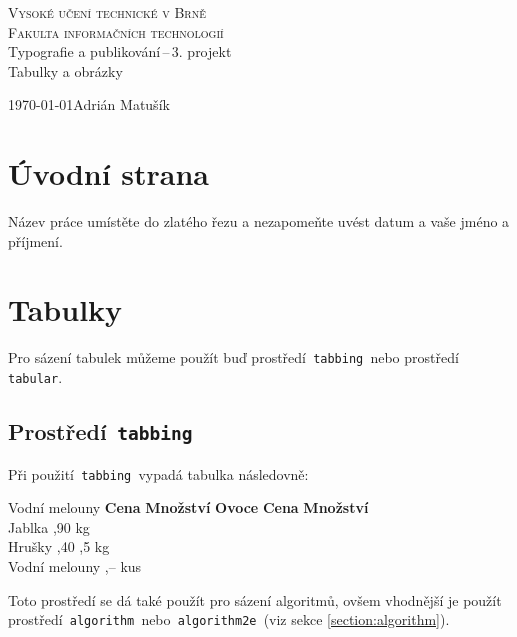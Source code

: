 \documentclass[a4paper, 11pt, ]{article}
\begin{document}
    \begin{titlepage}
        \begin{center}
            {\Huge \textsc{Vysoké učení technické v Brně}} \\ \medskip
            {\huge \textsc{Fakulta informačních technologií}} \\ 
            {\LARGE Typografie a publikování\,--\,3. projekt} \\ \medskip
            {\Huge Tabulky a obrázky}
        \end{center}
        {\Large \today \hfill Adrián Matušík}
    \end{titlepage}

\section{Úvodní strana}
Název práce umístěte do zlatého řezu a nezapomeňte uvést  datum a vaše jméno a příjmení.

\section{Tabulky}
Pro sázení tabulek můžeme použít buď prostředí\texttt{ tabbing }nebo prostředí\texttt{ tabular}.
\subsection{Prostředí\texttt{ tabbing }}
Při použití\texttt{ tabbing }vypadá tabulka následovně:
\begin{tabbing}
    Vodní melouny \quad \=\textbf{Cena} \quad \= \textbf{Množství} \kill
    \textbf{Ovoce}\> \textbf{Cena}\> \textbf{Množství} \\
    Jablka ,90  kg \\
    Hrušky ,40 ,5 kg \\
    Vodní melouny ,--  kus
\end{tabbing}
\bigskip
Toto prostředí se dá také použít pro sázení algoritmů, ovšem vhodnější je použít 
prostředí\texttt{ algorithm }nebo\texttt{ algorithm2e }(viz sekce \ref{section:algorithm}).
\end{document}
